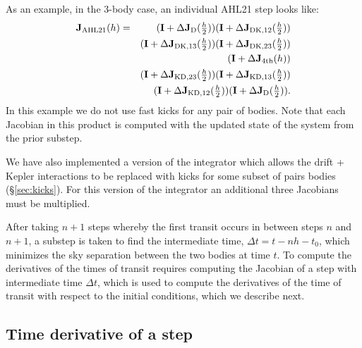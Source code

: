 \documentclass[fleqn,usenatbib,twocolumn]{mnras}
\begin{document}
As an example, in the 3-body case, an individual
{\sc AHL21} step looks like:
\begin{eqnarray}
   \mathbf{J}_\mathrm{AHL21}(h) &=& (\mathbf{I}+\Delta \mathbf{J}_\mathrm{D}(\tfrac{h}{2}))(\mathbf{I}+\Delta {\bf J}_{\mathrm{DK},12}(\tfrac{h}{2}))\cr
   && (\mathbf{I}+\Delta {\bf J}_{\mathrm{DK},13}(\tfrac{h}{2})) (\mathbf{I}+\Delta \mathbf{J}_{\mathrm{DK},23}(\tfrac{h}{2}))\cr
   && (\mathbf{I}+\Delta {\bf J}_\mathrm{4th}(h))\cr
   && (\mathbf{I}+\Delta \mathbf{J}_{\mathrm{KD},23}(\tfrac{h}{2}))(\mathbf{I}+\Delta \mathbf{J}_{\mathrm{KD},13}(\tfrac{h}{2}))\cr
   && (\mathbf{I}+\Delta \mathbf{J}_{\mathrm{KD},12}(\tfrac{h}{2}))(\mathbf{I}+\Delta \mathbf{J}_\mathrm{D}(\tfrac{h}{2})).
\end{eqnarray}
In this example we do not use fast kicks for any pair of bodies.
Note that each Jacobian in this product is computed with the updated
state of the system from the prior substep.

We have also implemented a version of the integrator which allows
the drift + Kepler interactions to be replaced with kicks for
some subset of pairs bodies (\S \ref{sec:kicks}).  For this
version of the integrator an additional three
Jacobians must be multiplied.

After taking $n+1$ steps whereby the first transit occurs in between
steps $n$ and $n+1$, a substep is taken to find the intermediate
time, $\Delta t=t-nh-t_0$,  which minimizes the sky separation between
the two bodies at time $t$.  To compute the derivatives of the times of transit
requires computing the Jacobian of a step with intermediate time
$\Delta t$, which is used to compute the derivatives of the time of
transit with respect to the initial conditions, which we describe next.

\subsection{Time derivative of a step}\label{sec:time_derivative}
\end{document}
